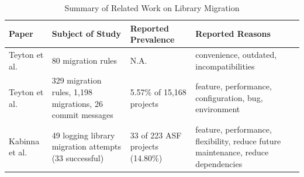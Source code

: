 \documentclass[sigconf, screen]{acmart}
\begin{document}
\begin{table}
  \caption{Summary of Related Work on Library Migration}
\vspace{-1mm}
  \label{tab:related-work}
  \begin{tabularx}{\linewidth}{lp{48mm}p{30mm}p{62mm}}
  \toprule
    Paper & Subject of Study & Reported Prevalence & Reported Reasons \\
    \midrule
    Teyton et al.~\cite{teyton2012mining} & 80 migration rules & N.A. & convenience, outdated, incompatibilities\\
    Teyton et al.~\cite{teyton2014study} & 329 migration rules, 1,198 migrations, 26 commit messages & 5.57\% of 15,168 projects & feature, performance, configuration, bug, environment\\
    Kabinna et al.~\cite{kabinna2016logging} & 49 logging library migration attempts (33 successful) & 33 of 223 ASF projects (14.80\%) & feature, performance, flexibility, reduce future maintenance, reduce dependencies \\
  \bottomrule
  \end{tabularx}
\end{table}
\end{document}
